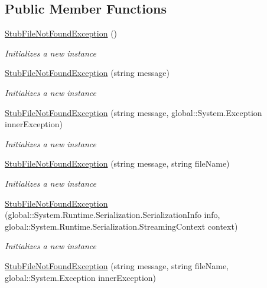 \subsection*{Public Member Functions}
\begin{DoxyCompactItemize}
\item 
\hyperlink{class_system_1_1_i_o_1_1_fakes_1_1_stub_file_not_found_exception_a6e6fb7767f116af2062255565977ef18}{Stub\-File\-Not\-Found\-Exception} ()
\begin{DoxyCompactList}\small\item\em Initializes a new instance\end{DoxyCompactList}\item 
\hyperlink{class_system_1_1_i_o_1_1_fakes_1_1_stub_file_not_found_exception_add8b5b129be092371307abe22e735168}{Stub\-File\-Not\-Found\-Exception} (string message)
\begin{DoxyCompactList}\small\item\em Initializes a new instance\end{DoxyCompactList}\item 
\hyperlink{class_system_1_1_i_o_1_1_fakes_1_1_stub_file_not_found_exception_ad0445e44f9b65c8ecd0a1586d6a860bc}{Stub\-File\-Not\-Found\-Exception} (string message, global\-::\-System.\-Exception inner\-Exception)
\begin{DoxyCompactList}\small\item\em Initializes a new instance\end{DoxyCompactList}\item 
\hyperlink{class_system_1_1_i_o_1_1_fakes_1_1_stub_file_not_found_exception_a68771404828f537afa63936b4de51cf3}{Stub\-File\-Not\-Found\-Exception} (string message, string file\-Name)
\begin{DoxyCompactList}\small\item\em Initializes a new instance\end{DoxyCompactList}\item 
\hyperlink{class_system_1_1_i_o_1_1_fakes_1_1_stub_file_not_found_exception_a0da6688667b9d07c9c7cf216cce505e7}{Stub\-File\-Not\-Found\-Exception} (global\-::\-System.\-Runtime.\-Serialization.\-Serialization\-Info info, global\-::\-System.\-Runtime.\-Serialization.\-Streaming\-Context context)
\begin{DoxyCompactList}\small\item\em Initializes a new instance\end{DoxyCompactList}\item 
\hyperlink{class_system_1_1_i_o_1_1_fakes_1_1_stub_file_not_found_exception_abe23c3e9bad6ae0cb9e12e11b1b20b1f}{Stub\-File\-Not\-Found\-Exception} (string message, string file\-Name, global\-::\-System.\-Exception inner\-Exception)

\end{DoxyCompactItemize}
